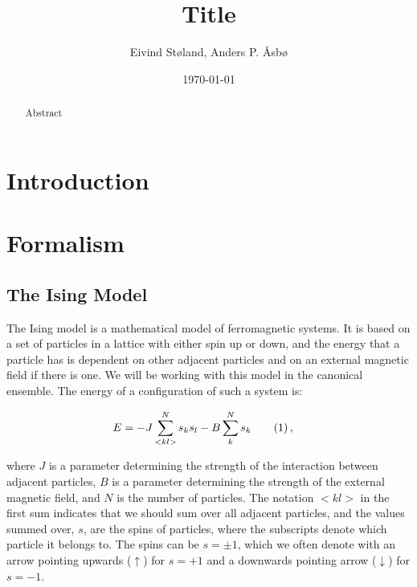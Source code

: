 \documentclass[reprint,english,notitlepage]{revtex4-1}  %
\newcommand\numberthis{\addtocounter{equation}{1}\tag{\theequation}}
\begin{document}
\title{Title}   %
\author{Eivind Støland, Anders P. Åsbø}               %
\date{\today}                             %
\noaffiliation                            %

\begin{abstract}
Abstract
\end{abstract}

\maketitle                                %


\tableofcontents

\section{Introduction} \label{sec:I}


\newpage

\section{Formalism} \label{sec:II}

\subsection{The Ising Model} \label{sec:II:a}

The Ising model is a mathematical model of ferromagnetic systems. It is based on a set of particles in a lattice with either spin up or down, and the energy that a particle has is dependent on other adjacent particles and on an external magnetic field if there is one. We will be working with this model in the canonical ensemble. The energy of a configuration of such a system is:

\begin{align*}
E &= -J \sum\limits_{<kl>}^N s_k s_l - B \sum\limits_k^N s_k \numberthis \label{eq:ising_general_total_energy} \, ,
\end{align*}

where $J$ is a parameter determining the strength of the interaction between adjacent particles, $B$ is a parameter determining the strength of the external magnetic field, and $N$ is the number of particles. The notation $<kl>$ in the first sum indicates that we should sum over all adjacent particles, and the values summed over, $s$, are the spins of particles, where the subscripts denote which particle it belongs to. The spins can be $s = \pm 1$, which we often denote with an arrow pointing upwards ($\uparrow$) for $s = +1$ and a downwards pointing arrow ($\downarrow$) for $s = -1$.
\end{document}
